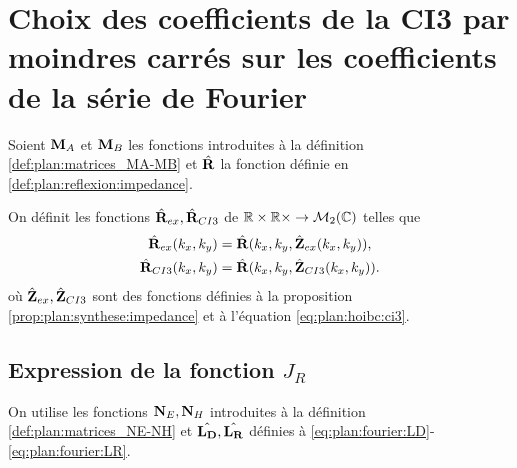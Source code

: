 \section[Choix 2 des coefficients de la CI3]{Choix des coefficients de la CI3 par moindres carrés sur les coefficients de la série de Fourier}

  Soient \(\mathbf{M}_A\) et \(\mathbf{M}_B\) les fonctions introduites à la définition \ref{def:plan:matrices_MA-MB} et \(\hat{\mathbf{R}}\) la fonction définie en \ref{def:plan:reflexion:impedance}.

  \begin{defn}%
    \label{def:plan:minimisation:matrices_MR}
    On définit les fonctions \(\hat{\mathbf{R}}_{ex}, \hat{\mathbf{R}}_{CI3}\) de \(\mathbb R\times\mathbb R\times \rightarrow \mathcal{M}_2(\mathbb C)\) telles que
    \begin{align*}
      \hat{\mathbf{R}}_{ex}(k_x,k_y) &= \hat{\mathbf{R}}(k_x,k_y, \hat{\mathbf{Z}}_{ex}(k_x,k_y)),
      \\
      \hat{\mathbf{R}}_{CI3}(k_x,k_y) &= \hat{\mathbf{R}}(k_x,k_y, \hat{\mathbf{Z}}_{CI3}(k_x,k_y)).
    \end{align*}
    où \(\hat{\mathbf{Z}}_{ex},\hat{\mathbf{Z}}_{CI3}\) sont des fonctions définies à la proposition \ref{prop:plan:synthese:impedance} et à l'équation \eqref{eq:plan:hoibc:ci3}.
  \end{defn}

  \subsection[Expression de la fonction JR]{Expression de la fonction \(J_R\)}

    On utilise les fonctions \(\mathbf{N}_E, \mathbf{N}_H\) introduites à la définition \ref{def:plan:matrices_NE-NH} et \(\hat{\mathbf{L_D}},\hat{\mathbf{L_R}}\) définies à \ref{eq:plan:fourier:LD}-\ref{eq:plan:fourier:LR}.

